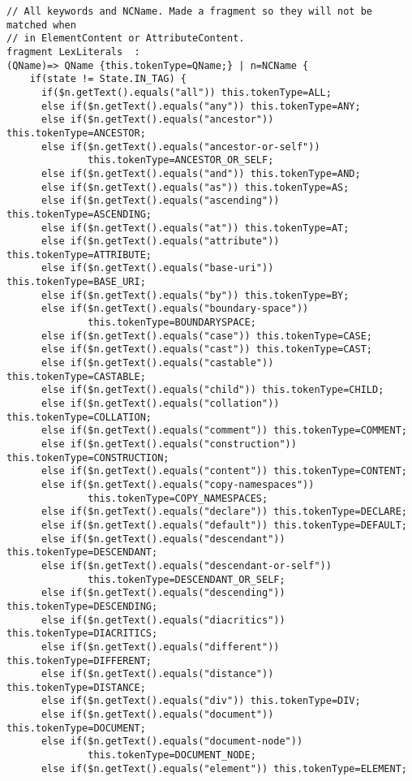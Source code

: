 \begin{verbatim}
// All keywords and NCName. Made a fragment so they will not be matched when
// in ElementContent or AttributeContent.
fragment LexLiterals  : 
(QName)=> QName {this.tokenType=QName;} | n=NCName {
    if(state != State.IN_TAG) {
      if($n.getText().equals("all")) this.tokenType=ALL;
      else if($n.getText().equals("any")) this.tokenType=ANY;
      else if($n.getText().equals("ancestor")) this.tokenType=ANCESTOR;
      else if($n.getText().equals("ancestor-or-self")) 
              this.tokenType=ANCESTOR_OR_SELF;
      else if($n.getText().equals("and")) this.tokenType=AND;
      else if($n.getText().equals("as")) this.tokenType=AS;
      else if($n.getText().equals("ascending")) this.tokenType=ASCENDING;
      else if($n.getText().equals("at")) this.tokenType=AT;
      else if($n.getText().equals("attribute")) this.tokenType=ATTRIBUTE;
      else if($n.getText().equals("base-uri")) this.tokenType=BASE_URI;
      else if($n.getText().equals("by")) this.tokenType=BY;
      else if($n.getText().equals("boundary-space")) 
              this.tokenType=BOUNDARYSPACE;
      else if($n.getText().equals("case")) this.tokenType=CASE;
      else if($n.getText().equals("cast")) this.tokenType=CAST;
      else if($n.getText().equals("castable")) this.tokenType=CASTABLE;
      else if($n.getText().equals("child")) this.tokenType=CHILD;
      else if($n.getText().equals("collation")) this.tokenType=COLLATION;
      else if($n.getText().equals("comment")) this.tokenType=COMMENT;
      else if($n.getText().equals("construction")) this.tokenType=CONSTRUCTION;
      else if($n.getText().equals("content")) this.tokenType=CONTENT;
      else if($n.getText().equals("copy-namespaces")) 
              this.tokenType=COPY_NAMESPACES;
      else if($n.getText().equals("declare")) this.tokenType=DECLARE;
      else if($n.getText().equals("default")) this.tokenType=DEFAULT;
      else if($n.getText().equals("descendant")) this.tokenType=DESCENDANT;
      else if($n.getText().equals("descendant-or-self"))  
              this.tokenType=DESCENDANT_OR_SELF;
      else if($n.getText().equals("descending")) this.tokenType=DESCENDING;
      else if($n.getText().equals("diacritics")) this.tokenType=DIACRITICS;
      else if($n.getText().equals("different")) this.tokenType=DIFFERENT;
      else if($n.getText().equals("distance")) this.tokenType=DISTANCE;
      else if($n.getText().equals("div")) this.tokenType=DIV;
      else if($n.getText().equals("document")) this.tokenType=DOCUMENT;
      else if($n.getText().equals("document-node")) 
              this.tokenType=DOCUMENT_NODE;
      else if($n.getText().equals("element")) this.tokenType=ELEMENT;

\end{verbatim}
